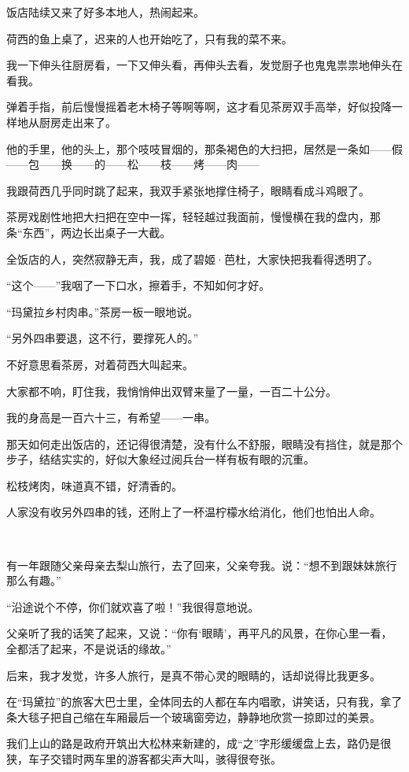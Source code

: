 \par 饭店陆续又来了好多本地人，热闹起来。
\par 荷西的鱼上桌了，迟来的人也开始吃了，只有我的菜不来。
\par 我一下伸头往厨房看，一下又伸头看，再伸头去看，发觉厨子也鬼鬼祟祟地伸头在看我。
\par 弹着手指，前后慢慢摇着老木椅子等啊等啊，这才看见茶房双手高举，好似投降一样地从厨房走出来了。
\par 他的手里，他的头上，那个吱吱冒烟的，那条褐色的大扫把，居然是一条如——假——包——换——的——松——枝——烤——肉——
\par 我跟荷西几乎同时跳了起来，我双手紧张地撑住椅子，眼睛看成斗鸡眼了。
\par 茶房戏剧性地把大扫把在空中一挥，轻轻越过我面前，慢慢横在我的盘内，那条“东西”，两边长出桌子一大截。
\par 全饭店的人，突然寂静无声，我，成了碧姬·芭杜，大家快把我看得透明了。
\par “这个——”我咽了一下口水，擦着手，不知如何才好。
\par “玛黛拉乡村肉串。”茶房一板一眼地说。
\par “另外四串要退，这不行，要撑死人的。”
\par 不好意思看茶房，对着荷西大叫起来。
\par 大家都不响，盯住我，我悄悄伸出双臂来量了一量，一百二十公分。
\par 我的身高是一百六十三，有希望——一串。
\par 那天如何走出饭店的，还记得很清楚，没有什么不舒服，眼睛没有挡住，就是那个步子，结结实实的，好似大象经过阅兵台一样有板有眼的沉重。
\par 松枝烤肉，味道真不错，好清香的。
\par 人家没有收另外四串的钱，还附上了一杯温柠檬水给消化，他们也怕出人命。
\par  
\par 有一年跟随父亲母亲去梨山旅行，去了回来，父亲夸我。说：“想不到跟妹妹旅行那么有趣。”
\par “沿途说个不停，你们就欢喜了啦！”我很得意地说。
\par 父亲听了我的话笑了起来，又说：“你有‘眼睛’，再平凡的风景，在你心里一看，全都活了起来，不是说话的缘故。”
\par 后来，我才发觉，许多人旅行，是真不带心灵的眼睛的，话却说得比我更多。
\par 在“玛黛拉”的旅客大巴士里，全体同去的人都在车内唱歌，讲笑话，只有我，拿了条大毯子把自己缩在车厢最后一个玻璃窗旁边，静静地欣赏一掠即过的美景。
\par 我们上山的路是政府开筑出大松林来新建的，成“之”字形缓缓盘上去，路仍是很狭，车子交错时两车里的游客都尖声大叫，骇得很夸张。
